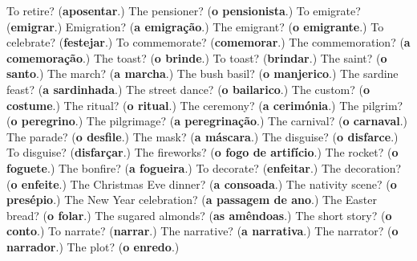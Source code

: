 \begin{tcolorbox}[breakable,colback=teal!4,colframe=teal!35!black,title={Before you move on}]
To retire? (\textbf{aposentar}.) The pensioner? (\textbf{o pensionista}.) To emigrate? (\textbf{emigrar}.) Emigration? (\textbf{a emigração}.) The emigrant? (\textbf{o emigrante}.) To celebrate? (\textbf{festejar}.) To commemorate? (\textbf{comemorar}.) The commemoration? (\textbf{a comemoração}.) The toast? (\textbf{o brinde}.) To toast? (\textbf{brindar}.) The saint? (\textbf{o santo}.) The march? (\textbf{a marcha}.) The bush basil? (\textbf{o manjerico}.) The sardine feast? (\textbf{a sardinhada}.) The street dance? (\textbf{o bailarico}.) The custom? (\textbf{o costume}.) The ritual? (\textbf{o ritual}.) The ceremony? (\textbf{a cerimónia}.) The pilgrim? (\textbf{o peregrino}.) The pilgrimage? (\textbf{a peregrinação}.) The carnival? (\textbf{o carnaval}.) The parade? (\textbf{o desfile}.) The mask? (\textbf{a máscara}.) The disguise? (\textbf{o disfarce}.) To disguise? (\textbf{disfarçar}.) The fireworks? (\textbf{o fogo de artifício}.) The rocket? (\textbf{o foguete}.) The bonfire? (\textbf{a fogueira}.) To decorate? (\textbf{enfeitar}.) The decoration? (\textbf{o enfeite}.) The Christmas Eve dinner? (\textbf{a consoada}.) The nativity scene? (\textbf{o presépio}.) The New Year celebration? (\textbf{a passagem de ano}.) The Easter bread? (\textbf{o folar}.) The sugared almonds? (\textbf{as amêndoas}.) The short story? (\textbf{o conto}.) To narrate? (\textbf{narrar}.) The narrative? (\textbf{a narrativa}.) The narrator? (\textbf{o narrador}.) The plot? (\textbf{o enredo}.)
\end{tcolorbox}
